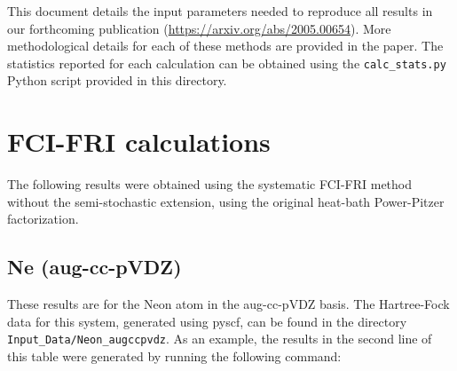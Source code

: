 \documentclass[12pt, landscape]{article}
\begin{document}
This document details the input parameters needed to reproduce all results in our forthcoming publication (\url{https://arxiv.org/abs/2005.00654}). More methodological details for each of these methods are provided in the paper. The statistics reported for each calculation can be obtained using the \texttt{calc\_stats.py} Python script provided in this directory.

\section*{FCI-FRI calculations}

The following results were obtained using the systematic FCI-FRI method without the semi-stochastic extension, using the original heat-bath Power-Pitzer factorization. 

\subsection*{Ne (aug-cc-pVDZ)}
These results are for the Neon atom in the aug-cc-pVDZ basis. The Hartree-Fock data for this system, generated using pyscf, can be found in the directory \texttt{Input\_Data/Neon\_augccpvdz}. As an example, the results in the second line of this table were generated by running the following command:
\end{document}
